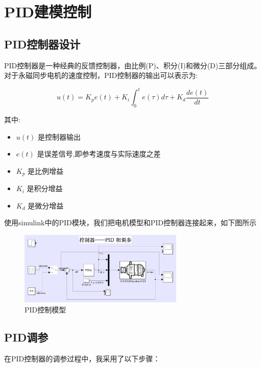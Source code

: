 \documentclass[12pt,a4paper,UTF8]{article}
\begin{document}
\clearpage
\section{PID建模控制}
\subsection{PID控制器设计}
PID控制器是一种经典的反馈控制器，由比例(P)、积分(I)和微分(D)三部分组成。对于永磁同步电机的速度控制，PID控制器的输出可以表示为:

\begin{equation}
u(t) = K_p e(t) + K_i \int_0^t e(\tau)d\tau + K_d \frac{de(t)}{dt}
\end{equation}

其中:
\begin{itemize}
\item $u(t)$ 是控制器输出
\item $e(t)$ 是误差信号,即参考速度与实际速度之差
\item $K_p$ 是比例增益
\item $K_i$ 是积分增益  
\item $K_d$ 是微分增益
\end{itemize}

使用simulink中的PID模块，我们把电机模型和PID控制器连接起来，如下图所示

\begin{figure}[htbp] \centering \includegraphics[width=0.7\textwidth]{2024-12-30-11-38-41.png} \caption{PID控制模型}\end{figure}


\subsection{PID调参}


在PID控制器的调参过程中，我采用了以下步骤：
\end{document}
